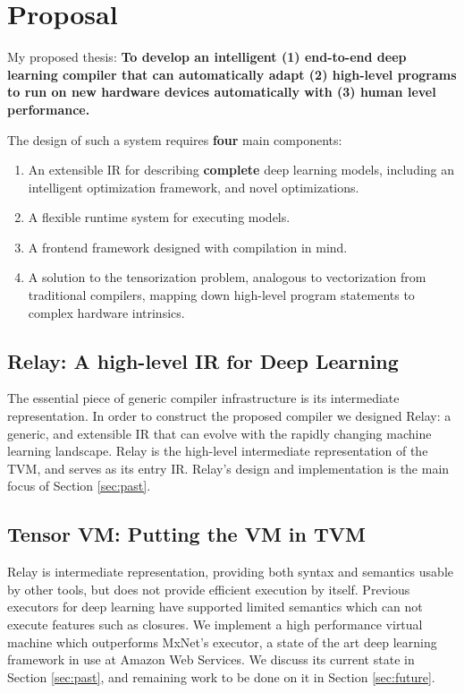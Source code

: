 \section{Proposal}

My proposed thesis: \textbf{To develop an intelligent (1) end-to-end deep learning compiler that can
automatically adapt (2) high-level programs to run on new hardware devices automatically
with (3) human level performance.}

The design of such a system requires \textbf{four} main components:
\begin{enumerate}
  \item An extensible IR for describing \textbf{complete} deep learning models,
        including an intelligent optimization framework, and novel optimizations.
  \item A flexible runtime system for executing models.
  \item A frontend framework designed with compilation in mind.
  \item A solution to the tensorization problem, analogous to vectorization from traditional
        compilers, mapping down high-level program statements to complex hardware intrinsics.
\end{enumerate}

\subsection{Relay: A high-level IR for Deep Learning}

The essential piece of generic compiler infrastructure is
  its intermediate representation.
In order to construct the proposed compiler we designed Relay: a generic, and
  extensible IR that can evolve with the rapidly changing
  machine learning landscape.
Relay is the high-level intermediate representation of the TVM,
  and serves as its entry IR.
Relay's design and implementation is the main focus of Section \ref{sec:past}.

\subsection{Tensor VM: Putting the VM in TVM}

Relay is intermediate representation, providing both
  syntax and semantics usable by other tools, but
  does not provide efficient execution by itself.
Previous executors for deep learning have supported
  limited semantics which can not execute features such as closures.
We implement a high performance virtual machine which
  outperforms MxNet's executor, a state of the art deep
  learning framework in use at Amazon Web Services.
We discuss its current state in Section \ref{sec:past},
  and remaining work to be done on it in Section \ref{sec:future}.

